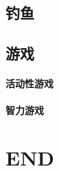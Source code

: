 \documentclass[UTF8]{../../ApplicationUniverse}
\begin{document}
\section{钓鱼}
\section{游戏}
    \subsubsection{活动性游戏}
    \subsubsection{智力游戏}





\chapter{END}
\end{document}
